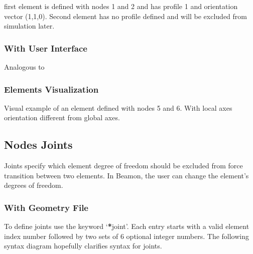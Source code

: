 \documentclass[letterpaper,10pt,english]{sphinxmanual}
\begin{document}
\begin{sphinxVerbatim}[commandchars=\\\{\}]
\end{sphinxVerbatim}

first element is defined with nodes 1 and 2 and has profile 1 and orientation vector (1,\sphinxhyphen{}1,0).
Second element has no profile defined and will be excluded from simulation later.


\subsubsection{With User Interface}
\label{\detokenize{making_a_model:id6}}
Analogous to {\hyperref[\detokenize{making_a_model:nodes-input}]{}}


\subsubsection{Elements Visualization}
\label{\detokenize{making_a_model:elements-visualization}}
Visual example of an element defined with nodes 5 and 6. With local axes orientation different from global axes.

\noindent{}


\subsection{Nodes Joints}
\label{\detokenize{making_a_model:nodes-joints}}
Joints specify which element degree of freedom should be excluded from force transition between two elements.
In Beamon, the user can change the element’s degrees of freedom.


\subsubsection{With Geometry File}
\label{\detokenize{making_a_model:id7}}
To define joints use the keyword ‘{\color{red}\bfseries{}*}joint’.
Each entry starts with a valid element index number followed by two sets of 6 optional integer numbers.
The following syntax diagram hopefully clarifies syntax for joints.
\end{document}
